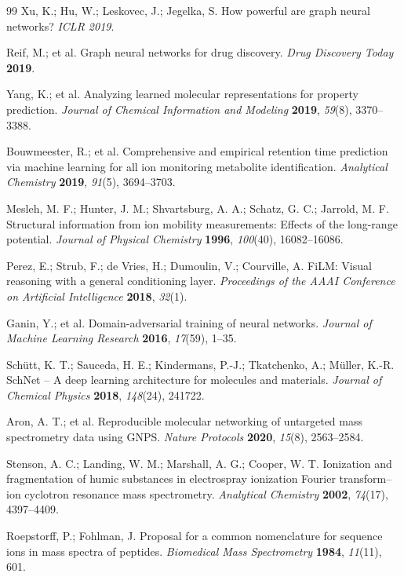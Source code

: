 \documentclass[journal=jcisd8]{achemso}
\begin{document}
\begin{thebibliography}{99}
Xu, K.; Hu, W.; Leskovec, J.; Jegelka, S.
How powerful are graph neural networks?
\textit{ICLR 2019}.

Reif, M.; et al.
Graph neural networks for drug discovery.
\textit{Drug Discovery Today} \textbf{2019}.

Yang, K.; et al.
Analyzing learned molecular representations for property prediction.
\textit{Journal of Chemical Information and Modeling} \textbf{2019}, \textit{59}(8), 3370--3388.

Bouwmeester, R.; et al.
Comprehensive and empirical retention time prediction via machine learning for all ion monitoring metabolite identification.
\textit{Analytical Chemistry} \textbf{2019}, \textit{91}(5), 3694--3703.

Mesleh, M. F.; Hunter, J. M.; Shvartsburg, A. A.; Schatz, G. C.; Jarrold, M. F.
Structural information from ion mobility measurements: Effects of the long-range potential.
\textit{Journal of Physical Chemistry} \textbf{1996}, \textit{100}(40), 16082--16086.

Perez, E.; Strub, F.; de Vries, H.; Dumoulin, V.; Courville, A.
FiLM: Visual reasoning with a general conditioning layer.
\textit{Proceedings of the AAAI Conference on Artificial Intelligence} \textbf{2018}, \textit{32}(1).

Ganin, Y.; et al.
Domain-adversarial training of neural networks.
\textit{Journal of Machine Learning Research} \textbf{2016}, \textit{17}(59), 1--35.

Schütt, K. T.; Sauceda, H. E.; Kindermans, P.-J.; Tkatchenko, A.; Müller, K.-R.
SchNet – A deep learning architecture for molecules and materials.
\textit{Journal of Chemical Physics} \textbf{2018}, \textit{148}(24), 241722.

Aron, A. T.; et al.
Reproducible molecular networking of untargeted mass spectrometry data using GNPS.
\textit{Nature Protocols} \textbf{2020}, \textit{15}(8), 2563--2584.

Stenson, A. C.; Landing, W. M.; Marshall, A. G.; Cooper, W. T.
Ionization and fragmentation of humic substances in electrospray ionization Fourier transform--ion cyclotron resonance mass spectrometry.
\textit{Analytical Chemistry} \textbf{2002}, \textit{74}(17), 4397--4409.

Roepstorff, P.; Fohlman, J.
Proposal for a common nomenclature for sequence ions in mass spectra of peptides.
\textit{Biomedical Mass Spectrometry} \textbf{1984}, \textit{11}(11), 601.

\end{thebibliography}
\end{document}
